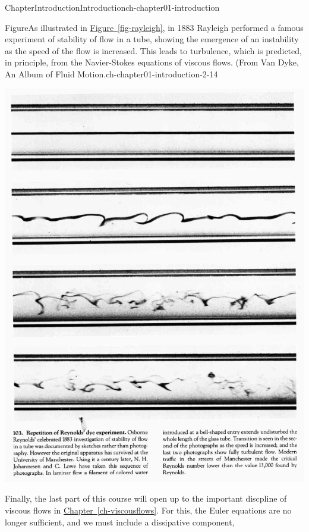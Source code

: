 \documentclass[oneside,10pt,]{book}
\newcommand{\xreffont}{\relax}
\numberwithin{equation}{section}
\begin{document}
\begin{chapterptx}{Chapter}{Introduction}{}{Introduction}{}{}{ch-chapter01-introduction}
\begin{introduction}{}
\begin{figureptx}{Figure}{As illustrated in \hyperref[fig-rayleigh]{Figure~{\xreffont\ref{fig-rayleigh}}}, in 1883 Rayleigh performed a famous experiment of stability of flow in a tube, showing the emergence of an instability as the speed of the flow is increased. This leads to turbulence, which is predicted, in principle, from the Navier-Stokes equations of viscous flows. (From Van Dyke, An Album of Fluid Motion.}{ch-chapter01-introduction-2-14}{}%
\begin{image}{0.15}{0.7}{0.15}{}%
\includegraphics[width=\linewidth]{external/turbulence.png}
\end{image}%
\tcblower
\end{figureptx}%
Finally, the last part of this course will open up to the important discpline of viscous flows in \hyperref[ch-viscousflows]{Chapter~{\xreffont\ref{ch-viscousflows}}}. For this, the Euler equations are no longer sufficient, and we must include a dissipative component,%
\begin{equation*}

\end{equation*}
\end{introduction}
\end{chapterptx}
\end{document}

